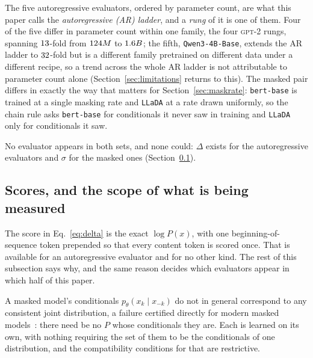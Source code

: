 \documentclass[11pt]{article}
\begin{document}
The five autoregressive evaluators, ordered by parameter count, are what
this paper calls the \emph{autoregressive (AR) ladder}, and a \emph{rung}
of it is one of them.  Four of the five differ in parameter count within one
family, the four \textsc{gpt-2} rungs, spanning $13$-fold from
$124M$ to $1.6B$; the fifth, \texttt{Qwen3-4B-Base},
extends the AR ladder to $32$-fold but is a different family
pretrained on different data under a different recipe, so a
trend across the whole AR ladder is not attributable to parameter count alone
(Section~\ref{sec:limitations} returns to this).  The masked pair differs in
exactly the way that matters for Section~\ref{sec:maskrate}:
\texttt{bert-base} is trained at a single masking rate and \texttt{LLaDA} at
a rate drawn uniformly, so the chain rule asks \texttt{bert-base} for
conditionals it never saw in training and \texttt{LLaDA} only for
conditionals it saw.

No evaluator appears in both sets, and none could: $\Delta$ exists for the
autoregressive evaluators and $\sigma$ for the masked ones
(Section~\ref{sec:scope}).

\subsection{Scores, and the scope of what is being measured}
\label{sec:scope}
The score in Eq.~\eqref{eq:delta} is the exact $\log P(x)$, with one
beginning-of-sequence token prepended so that every content token is scored
once.  That is available for an autoregressive evaluator and for no other
kind.  The rest of this subsection says why, and the same reason decides
which evaluators appear in which half of this paper.

A masked model's conditionals $p_\theta(x_k \mid x_{-k})$ do not in general
correspond to any consistent joint distribution, a failure certified directly
for modern masked models~\cite{rectangle}: there need be no $P$ whose
conditionals they are.  Each is learned on its own, with nothing requiring
the set of them to be the conditionals of one distribution, and the
compatibility conditions for that are restrictive.
\end{document}
